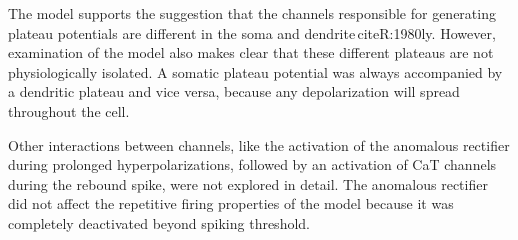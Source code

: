 \documentclass[12pt]{article}
\begin{document}
The model supports the suggestion that the channels responsible
for generating plateau potentials are different in
the soma and dendrite\,cite{R:1980ly}. However,
examination of the model also makes clear that these
different plateaus are not physiologically isolated. A somatic
plateau potential was always accompanied by a dendritic
plateau and vice versa, because any depolarization
will spread throughout the cell.

Other interactions between channels, like the activation
of the anomalous rectifier during prolonged hyperpolarizations,
followed by an activation of CaT channels during the
rebound spike, were not explored in detail. The anomalous
rectifier did not affect the repetitive firing properties of the
model because it was completely deactivated beyond spiking threshold.



\end{document}

